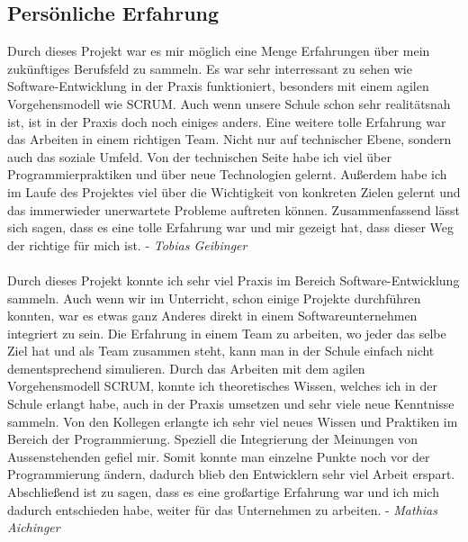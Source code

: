 \subsection{Persönliche Erfahrung}
\par
\begingroup
\leftskip=1cm 
\rightskip=1cm 
\noindent
Durch dieses Projekt war es mir möglich eine Menge Erfahrungen über mein zukünftiges Berufsfeld zu sammeln. Es war sehr interressant zu sehen wie Software-Entwicklung in der Praxis funktioniert, besonders mit einem agilen Vorgehensmodell wie SCRUM. Auch wenn unsere Schule schon sehr realitätsnah ist, ist in der Praxis doch noch einiges anders. Eine weitere tolle Erfahrung war das Arbeiten in einem richtigen Team. Nicht nur auf technischer Ebene, sondern auch das soziale Umfeld. Von der technischen Seite habe ich viel über Programmierpraktiken und über neue Technologien gelernt.  Außerdem habe ich im Laufe des Projektes viel über die Wichtigkeit von konkreten Zielen gelernt und das immerwieder unerwartete Probleme auftreten können. Zusammenfassend lässt sich sagen, dass es eine tolle Erfahrung war und mir gezeigt hat, dass dieser Weg der richtige für mich ist. - \textit{Tobias Geibinger}
\\\\
Durch dieses Projekt konnte ich sehr viel Praxis im Bereich Software-Entwicklung sammeln. Auch wenn wir im Unterricht, schon einige Projekte durchführen konnten, war es etwas ganz Anderes direkt in einem Softwareunternehmen integriert zu sein. Die Erfahrung in einem Team zu arbeiten, wo jeder das selbe Ziel hat und als Team zusammen steht, kann man in der Schule einfach nicht dementsprechend  simulieren. Durch das Arbeiten mit dem agilen Vorgehensmodell SCRUM, konnte ich theoretisches Wissen, welches ich in der Schule erlangt habe, auch in der Praxis umsetzen und sehr viele neue Kenntnisse sammeln. Von den Kollegen erlangte ich sehr viel neues Wissen und Praktiken im Bereich der Programmierung. Speziell die Integrierung der Meinungen von Aussenstehenden gefiel mir. Somit konnte man einzelne Punkte noch vor der Programmierung ändern, dadurch blieb den Entwicklern sehr viel Arbeit erspart. Abschließend ist zu sagen, dass es eine großartige Erfahrung war und ich mich dadurch entschieden habe, weiter für das Unternehmen zu arbeiten. - \textit{Mathias Aichinger}
\par
\endgroup
